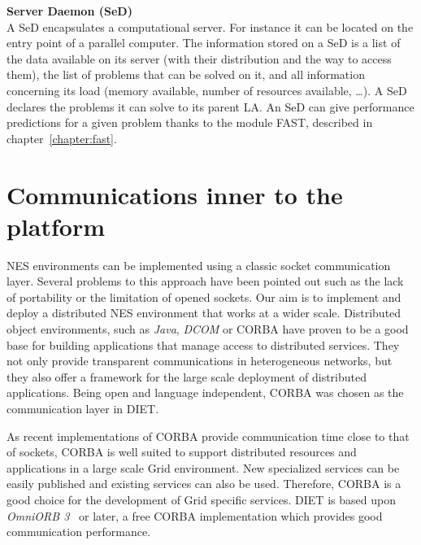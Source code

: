 \begin{description}
\item \textbf{Server Daemon (SeD)}\\
  A SeD encapsulates a computational server. For instance it can be
  located on the entry point of a parallel computer. The information
  stored on a SeD is a list of the data available on its server (with
  their distribution and the way to access them), the list of problems
  that can be solved on it, and all information concerning its load
  (memory available, number of resources available, \ldots). A SeD
  declares the problems it can solve to its parent LA.  An SeD can
  give performance predictions for a given problem thanks to the
  module FAST, described in chapter~\ref{chapter:fast}.

\end{description}


\section{Communications inner to the platform}
\label{sec:CORBA}

NES environments can be implemented using a classic socket
communication layer.  Several problems to this approach have been
pointed out such as the lack of portability or the limitation of
opened sockets. Our aim is to implement and deploy a distributed NES
environment that works at a wider scale. Distributed object
environments, such as \emph{Java}, \emph{DCOM} or CORBA have proven to
be a good base for building applications that manage access to
distributed services. They not only provide transparent communications
in heterogeneous networks, but they also offer a framework for the
large scale deployment of distributed applications. Being open and
language independent, CORBA was chosen as the communication layer in
DIET.

As recent implementations of CORBA provide communication time close to
that of sockets, CORBA is well suited to support distributed resources
and applications in a large scale Grid environment. New specialized
services can be easily published and existing services can also be
used.  Therefore, CORBA is a good choice for the development of Grid
specific services. DIET is based upon \emph{OmniORB 3}~\cite{OMNIORB}
or later, a free CORBA implementation which provides good
communication performance.


